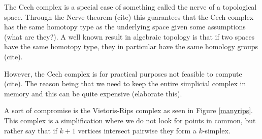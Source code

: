 The Cech complex is a special case of something called the nerve of a topological space. Through the Nerve theorem (cite) this guarantees that the Cech complex has the same homotopy type as the underlying space given some assumptions (what are they?). A well known result in algebraic topology is that if two spaces have the same homotopy type, they in particular have the same homology groups (cite).

However, the Cech complex is for practical purposes not feasible to compute (cite). The reason being that we need to keep the entire simplicial complex in memory and this can be quite expensive (elaborate this).

A sort of compromise is the Vietoris-Rips complex as seen in Figure \ref{manyrips}. This complex is a simplification where we do not look for points in common, but rather say that if $k+1$ vertices intersect pairwise they form a $k$-simplex.

